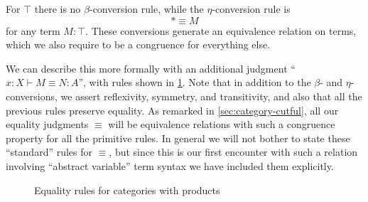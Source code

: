 \documentclass{book}
\let\types\vdash
\def\unit{\top}%
\def\ttt{\mathord{\ast}}%
\def\pair#1#2{\langle #1,#2\rangle}
\def\pr#1#2#3{\pi_{#1}^{#2,#3}}
\begin{document}
For $\unit$ there is no $\beta$-conversion rule, while the $\eta$-conversion rule is
\begin{equation}\label{eq:eta-unit}
  \ttt \equiv M
\end{equation}
for any term $M:\unit$.
These conversions generate an equivalence relation on terms, which we also require to be a congruence for everything else.

We can describe this more formally with an additional judgment ``$x:X\types M\equiv N :A$'', with rules shown in  \cref{fig:catprod-equality}.
Note that in addition to the $\beta$- and $\eta$-conversions, we assert reflexivity, symmetry, and transitivity, and also that all the previous rules preserve equality.
As remarked in \cref{sec:category-cutful}, all our equality judgments $\equiv$ will be equivalence relations with such a congruence property for all the primitive rules.
In general we will not bother to state these ``standard'' rules for $\equiv$, but since this is our first encounter with such a relation involving ``abstract variable'' term syntax we have included them explicitly.

\begin{figure}
  \centering
  \caption{Equality rules for categories with products}
  \label{fig:catprod-equality}
\end{figure}
\end{document}
